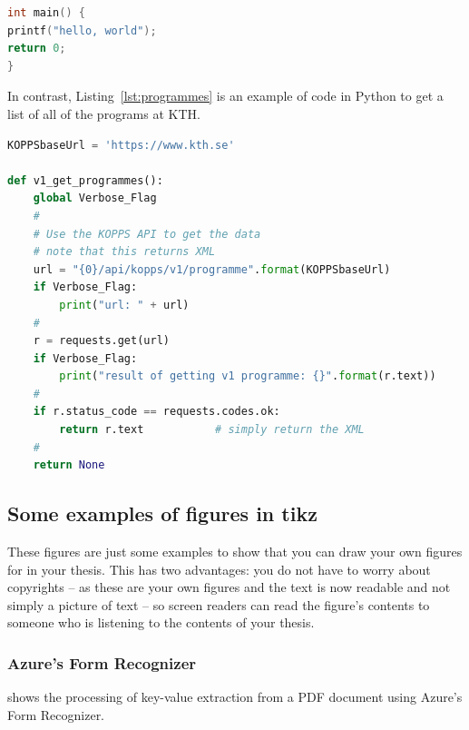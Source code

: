 \begin{lstlisting}[language={C}, caption={Hello world in C code}, label=lst:helloWorldInC]
int main() {
printf("hello, world");
return 0;
}
\end{lstlisting}


In contrast, Listing~\ref{lst:programmes} is an example of code in Python to
get a list of all of the programs at KTH.

\lstset{extendedchars=true}  %
\begin{lstlisting}[language={Python}, caption={Using a python program to
    access the KTH API to get all of the programs at KTH}, label=lst:programmes]
KOPPSbaseUrl = 'https://www.kth.se'

def v1_get_programmes():
    global Verbose_Flag
    #
    # Use the KOPPS API to get the data
    # note that this returns XML
    url = "{0}/api/kopps/v1/programme".format(KOPPSbaseUrl)
    if Verbose_Flag:
        print("url: " + url)
    #
    r = requests.get(url)
    if Verbose_Flag:
        print("result of getting v1 programme: {}".format(r.text))
    #
    if r.status_code == requests.codes.ok:
        return r.text           # simply return the XML
    #
    return None
\end{lstlisting}
\FloatBarrier

\subsection{Some examples of figures in tikz}

These figures are just some examples to show that you can draw your own figures for in your thesis. This has two advantages: \first you do not have to worry about copyrights -- as these are your own figures and \Second the text is now readable and not simply a picture of text -- so screen readers can read the figure's contents to someone who is listening to the contents of your thesis.

\subsubsection{Azure's Form Recognizer}
 shows the processing of key-value extraction from a PDF document using Azure's Form Recognizer. 

